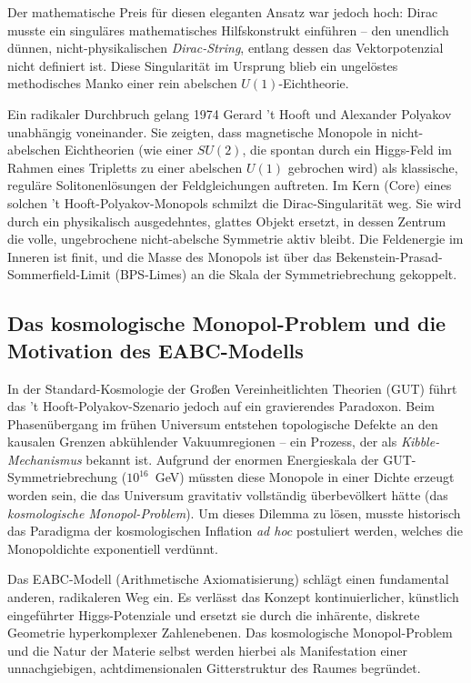 \documentclass[11pt,a4paper]{article}
\begin{document}
Der mathematische Preis für diesen eleganten Ansatz war jedoch hoch: Dirac musste ein singuläres mathematisches Hilfskonstrukt einführen -- den unendlich dünnen, nicht-physikalischen \textit{Dirac-String}, entlang dessen das Vektorpotenzial nicht definiert ist. Diese Singularität im Ursprung blieb ein ungelöstes methodisches Manko einer rein abelschen $U(1)$-Eichtheorie.

Ein radikaler Durchbruch gelang 1974 Gerard 't Hooft und Alexander Polyakov unabhängig voneinander. Sie zeigten, dass magnetische Monopole in nicht-abelschen Eichtheorien (wie einer $SU(2)$, die spontan durch ein Higgs-Feld im Rahmen eines Tripletts zu einer abelschen $U(1)$ gebrochen wird) als klassische, reguläre Solitonenlösungen der Feldgleichungen auftreten. Im Kern (Core) eines solchen 't Hooft-Polyakov-Monopols schmilzt die Dirac-Singularität weg. Sie wird durch ein physikalisch ausgedehntes, glattes Objekt ersetzt, in dessen Zentrum die volle, ungebrochene nicht-abelsche Symmetrie aktiv bleibt. Die Feldenergie im Inneren ist finit, und die Masse des Monopols ist über das Bekenstein-Prasad-Sommerfield-Limit (BPS-Limes) an die Skala der Symmetriebrechung gekoppelt.

\subsection{Das kosmologische Monopol-Problem und die Motivation des EABC-Modells}
In der Standard-Kosmologie der Großen Vereinheitlichten Theorien (GUT) führt das 't Hooft-Polyakov-Szenario jedoch auf ein gravierendes Paradoxon. Beim Phasenübergang im frühen Universum entstehen topologische Defekte an den kausalen Grenzen abkühlender Vakuumregionen -- ein Prozess, der als \textit{Kibble-Mechanismus} bekannt ist. Aufgrund der enormen Energieskala der GUT-Symmetriebrechung ($10^{16}$~GeV) müssten diese Monopole in einer Dichte erzeugt worden sein, die das Universum gravitativ vollständig überbevölkert hätte (das \textit{kosmologische Monopol-Problem}). Um dieses Dilemma zu lösen, musste historisch das Paradigma der kosmologischen Inflation \textit{ad hoc} postuliert werden, welches die Monopoldichte exponentiell verdünnt.

Das EABC-Modell (Arithmetische Axiomatisierung) schlägt einen fundamental anderen, radikaleren Weg ein. Es verlässt das Konzept kontinuierlicher, künstlich eingeführter Higgs-Potenziale und ersetzt sie durch die inhärente, diskrete Geometrie hyperkomplexer Zahlenebenen. Das kosmologische Monopol-Problem und die Natur der Materie selbst werden hierbei als Manifestation einer unnachgiebigen, achtdimensionalen Gitterstruktur des Raumes begründet.
\end{document}

